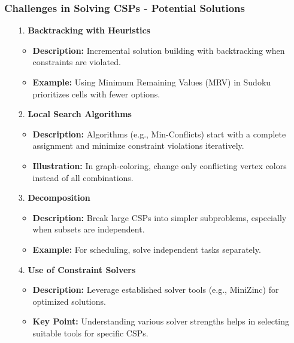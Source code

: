 \documentclass[aspectratio=169]{beamer}
\begin{document}
\begin{frame}[fragile]
    \frametitle{Challenges in Solving CSPs - Potential Solutions}
    \begin{enumerate}
        \item[1.] \textbf{Backtracking with Heuristics}
            \begin{itemize}
                \item \textbf{Description:} Incremental solution building with backtracking when constraints are violated.
                \item \textbf{Example:} Using Minimum Remaining Values (MRV) in Sudoku prioritizes cells with fewer options.
            \end{itemize}
        
        \item[2.] \textbf{Local Search Algorithms}
            \begin{itemize}
                \item \textbf{Description:} Algorithms (e.g., Min-Conflicts) start with a complete assignment and minimize constraint violations iteratively.
                \item \textbf{Illustration:} In graph-coloring, change only conflicting vertex colors instead of all combinations.
            \end{itemize}
        
        \item[3.] \textbf{Decomposition}
            \begin{itemize}
                \item \textbf{Description:} Break large CSPs into simpler subproblems, especially when subsets are independent.
                \item \textbf{Example:} For scheduling, solve independent tasks separately.
            \end{itemize}
        
        \item[4.] \textbf{Use of Constraint Solvers}
            \begin{itemize}
                \item \textbf{Description:} Leverage established solver tools (e.g., MiniZinc) for optimized solutions.
                \item \textbf{Key Point:} Understanding various solver strengths helps in selecting suitable tools for specific CSPs.
            \end{itemize}
    \end{enumerate}
\end{frame}
\end{document}
